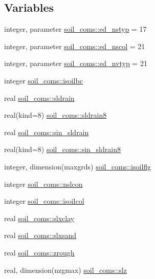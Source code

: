\subsection*{Variables}
\begin{DoxyCompactItemize}
\item 
integer, parameter \hyperlink{namespacesoil__coms_a354035bf03f4bb65c1636100aa6737e8}{soil\+\_\+coms\+::ed\+\_\+nstyp} = 17
\item 
integer, parameter \hyperlink{namespacesoil__coms_a359b4988ce0556dd6f2138752c38d3dc}{soil\+\_\+coms\+::ed\+\_\+nscol} = 21
\item 
integer, parameter \hyperlink{namespacesoil__coms_a8cb5da734a6673c4b75b841d0b4221aa}{soil\+\_\+coms\+::ed\+\_\+nvtyp} = 21
\item 
integer \hyperlink{namespacesoil__coms_aaaf0d1eb40467ca926f9c31a296885bc}{soil\+\_\+coms\+::isoilbc}
\item 
real \hyperlink{namespacesoil__coms_af1b6a6b86baeaad4354a141fdf9cfb04}{soil\+\_\+coms\+::sldrain}
\item 
real(kind=8) \hyperlink{namespacesoil__coms_aa7685a29e0e9621f0cde33dfcca345cc}{soil\+\_\+coms\+::sldrain8}
\item 
real \hyperlink{namespacesoil__coms_a7162076a5aaec83255f06fe55f799e31}{soil\+\_\+coms\+::sin\+\_\+sldrain}
\item 
real(kind=8) \hyperlink{namespacesoil__coms_a29640d5396281a106cd29a5433cc4896}{soil\+\_\+coms\+::sin\+\_\+sldrain8}
\item 
integer, dimension(maxgrds) \hyperlink{namespacesoil__coms_af246f6fbfc228e2eb7f079f811c1f3da}{soil\+\_\+coms\+::isoilflg}
\item 
integer \hyperlink{namespacesoil__coms_a461eb2939beb7809ce27cce9b68cb38f}{soil\+\_\+coms\+::nslcon}
\item 
integer \hyperlink{namespacesoil__coms_aa4458d218daa96cebe1a8c8a63cbf72f}{soil\+\_\+coms\+::isoilcol}
\item 
real \hyperlink{namespacesoil__coms_a148f65826100f4c235d31e4dbc2c9b1e}{soil\+\_\+coms\+::slxclay}
\item 
real \hyperlink{namespacesoil__coms_a4efc340287b7aa303bb409d4c537e55a}{soil\+\_\+coms\+::slxsand}
\item 
real \hyperlink{namespacesoil__coms_ae83360d4f03ca2a56ab9de2732d47533}{soil\+\_\+coms\+::zrough}
\item 
real, dimension(nzgmax) \hyperlink{namespacesoil__coms_aa22f925477a7c574761c66d5f157cc7d}{soil\+\_\+coms\+::slz}
\item 

\end{DoxyCompactItemize}
